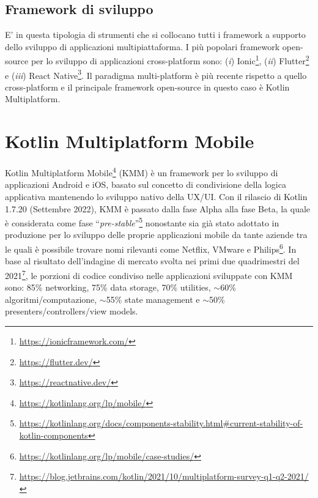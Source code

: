 \subsection*{Framework di sviluppo}
E' in questa tipologia di strumenti che si collocano tutti i framework a supporto dello sviluppo di applicazioni multipiattaforma.
I più popolari framework open-source per lo sviluppo di applicazioni cross-platform sono: 
(\textit{i}) Ionic\footnote{\href{https://ionicframework.com/}{https://ionicframework.com/}}, 
(\textit{ii}) Flutter\footnote{\href{https://flutter.dev/}{https://flutter.dev/}} e (\textit{iii}) React Native\footnote{\href{https://reactnative.dev/}{https://reactnative.dev/}}. 
Il paradigma multi-platform è più recente rispetto a quello cross-platform e il principale framework open-source in questo caso è Kotlin Multiplatform.

\section{Kotlin Multiplatform Mobile}
Kotlin Multiplatform Mobile\footnote{\href{https://kotlinlang.org/lp/mobile/}{https://kotlinlang.org/lp/mobile/}} (KMM) è un framework per lo sviluppo di applicazioni Android e iOS,
basato sul concetto di condivisione della logica applicativa mantenendo lo sviluppo nativo della UX/UI.
Con il rilascio di Kotlin 1.7.20 (Settembre 2022), 
KMM è passato dalla fase Alpha alla fase Beta,
la quale è considerata come fase ``\textit{pre-stable}''\footnote{\href{https://kotlinlang.org/docs/components-stability.html\#current-stability-of-kotlin-components}{https://kotlinlang.org/docs/components-stability.html\#current-stability-of-kotlin-components}} nonostante sia già stato adottato in produzione per lo sviluppo delle proprie applicazioni mobile da tante aziende tra le quali è possibile trovare nomi rilevanti come Netflix, 
VMware e Philips\footnote{\href{https://kotlinlang.org/lp/mobile/case-studies/}{https://kotlinlang.org/lp/mobile/case-studies/}}. 
In base al risultato dell'indagine di mercato svolta nei primi due quadrimestri del 2021\footnote{\href{https://blog.jetbrains.com/kotlin/2021/10/multiplatform-survey-q1-q2-2021/}{https://blog.jetbrains.com/kotlin/2021/10/multiplatform-survey-q1-q2-2021/}}, 
le porzioni di codice condiviso nelle applicazioni sviluppate con KMM sono: 
85\% networking, 
75\% data storage, 
70\% utilities, 
$\sim$60\% algoritmi/computazione, 
$\sim$55\% state management e 
$\sim$50\% presenters/controllers/view models.

